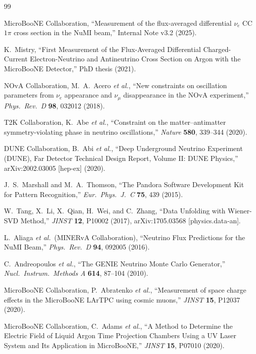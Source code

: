 \documentclass[11pt,a4paper]{article}
\begin{document}
\begin{thebibliography}{99}

  MicroBooNE Collaboration,
  ``Measurement of the flux-averaged differential $\nu_e$ CC$1\pi$ cross section
  in the NuMI beam,'' Internal Note v3.2 (2025).

  K.~Mistry,
  ``First Measurement of the Flux-Averaged Differential Charged-Current
  Electron-Neutrino and Antineutrino Cross Section on Argon with the MicroBooNE
  Detector,'' PhD thesis (2021).

  NOvA Collaboration, M.~A.~Acero \textit{et al.},
  ``New constraints on oscillation parameters from $\nu_e$ appearance and
  $\nu_\mu$ disappearance in the NOvA experiment,''
  \textit{Phys.\ Rev.\ D} \textbf{98}, 032012 (2018).

  T2K Collaboration, K.~Abe \textit{et al.},
  ``Constraint on the matter--antimatter symmetry-violating phase in neutrino
  oscillations,''
  \textit{Nature} \textbf{580}, 339--344 (2020).

  DUNE Collaboration, B.~Abi \textit{et al.},
  ``Deep Underground Neutrino Experiment (DUNE), Far Detector Technical Design
  Report, Volume II: DUNE Physics,'' arXiv:2002.03005 [hep-ex] (2020).

  J.~S.~Marshall and M.~A.~Thomson,
  ``The Pandora Software Development Kit for Pattern Recognition,''
  \textit{Eur.\ Phys.\ J.\ C} \textbf{75}, 439 (2015).

  W.~Tang, X.~Li, X.~Qian, H.~Wei, and C.~Zhang,
  ``Data Unfolding with Wiener-SVD Method,''
  \textit{JINST} \textbf{12}, P10002 (2017), arXiv:1705.03568 [physics.data-an].

  L.~Aliaga \textit{et al.}\ (MINERvA Collaboration),
  ``Neutrino Flux Predictions for the NuMI Beam,''
  \textit{Phys.\ Rev.\ D} \textbf{94}, 092005 (2016).

  C.~Andreopoulos \textit{et al.},
  ``The GENIE Neutrino Monte Carlo Generator,''
  \textit{Nucl.\ Instrum.\ Methods A} \textbf{614}, 87--104 (2010).

  MicroBooNE Collaboration, P.~Abratenko \textit{et al.},
  ``Measurement of space charge effects in the MicroBooNE LArTPC using cosmic
  muons,''
  \textit{JINST} \textbf{15}, P12037 (2020).

  MicroBooNE Collaboration, C.~Adams \textit{et al.},
  ``A Method to Determine the Electric Field of Liquid Argon Time Projection
  Chambers Using a UV Laser System and Its Application in MicroBooNE,''
  \textit{JINST} \textbf{15}, P07010 (2020).


\end{thebibliography}
\end{document}
